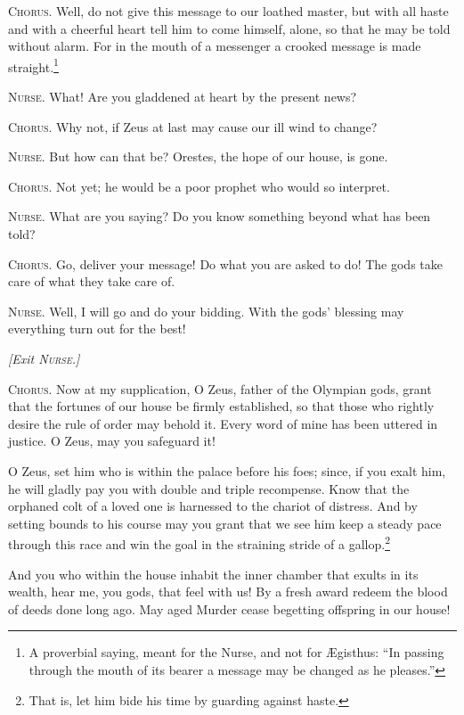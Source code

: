 \documentclass[12pt]{article}
\begin{document}
\textsc{Chorus.} Well, do not give this message to our loathed master, but with all haste and with a cheerful heart tell him to come himself, alone, so that he may be told without alarm. For in the mouth of a messenger a crooked message is made straight.\footnote{A proverbial saying, meant for the Nurse, and not for {\AE}gisthus: ``In passing through the mouth of its bearer a message may be changed as he pleases.''}

\textsc{Nurse.} What! Are you gladdened at heart by the present news?

\textsc{Chorus.} Why not, if Zeus at last may cause our ill wind to change?

\textsc{Nurse.} But how can that be? Orestes, the hope of our house, is gone.

\textsc{Chorus.} Not yet; he would be a poor prophet who would so interpret.

\textsc{Nurse.} What are you saying? Do you know something beyond what has been told?

\textsc{Chorus.} Go, deliver your message! Do what you are asked to do! The gods take care of what they take care of.

\textsc{Nurse.} Well, I will go and do your bidding. With the gods' blessing may everything turn out for the best!

\begin{center}
\textit{[Exit \textsc{Nurse.}]}
\end{center}

\textsc{Chorus.} Now at my supplication, O Zeus, father of the Olympian gods, grant that the fortunes of our house be firmly established, so that those who rightly desire the rule of order may behold it. Every word of mine has been uttered in justice. O Zeus, may you safeguard it!

O Zeus, set him who is within the palace before his foes; since, if you exalt him, he will gladly pay you with double and triple recompense. Know that the orphaned colt of a loved one is harnessed to the chariot of distress. And by setting bounds to his course may you grant that we see him keep a steady pace through this race and win the goal in the straining stride of a gallop.\footnote{That is, let him bide his time by guarding against haste.}

And you who within the house inhabit the inner chamber that exults in its wealth, hear me, you gods, that feel with us! By a fresh award redeem the blood of deeds done long ago. May aged Murder cease begetting offspring in our house!
\end{document}
